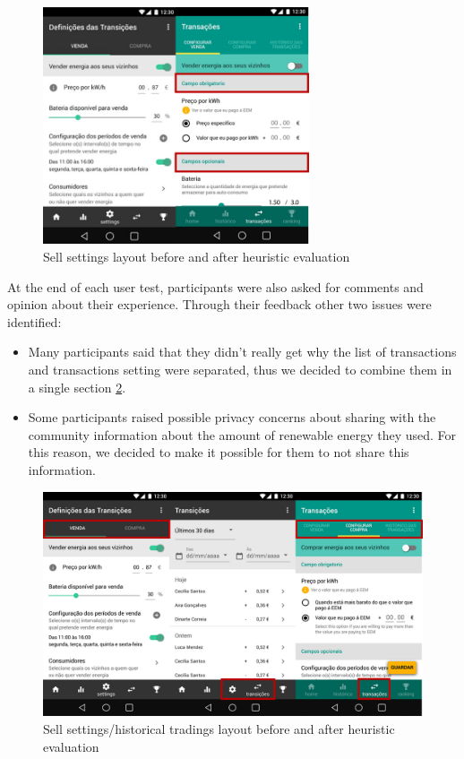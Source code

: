 \begin{figure}[h]
\centering
\includegraphics[width=0.7\textwidth]{./Images/ps1}
\caption{Sell settings layout before and after heuristic evaluation}
\label{fig:ps1}
\end{figure}


At the end of each user test, participants were also asked for comments and opinion about their experience. Through their feedback other two issues were identified:

\begin{itemize}
    \item Many participants said that they didn't really get why the list of transactions and transactions setting were separated, thus we decided to combine them in a single section \cref{fig:ps2}.
    \item Some participants raised possible privacy concerns about sharing with the community information about the amount of renewable energy they used. For this reason, we decided to make it possible for them to not share this information.
\end{itemize}


\begin{figure}[h]
\centering
\includegraphics[width=1\textwidth]{./Images/ps2}
\caption{Sell settings/historical tradings layout before and after heuristic evaluation}
\label{fig:ps2}
\end{figure}

